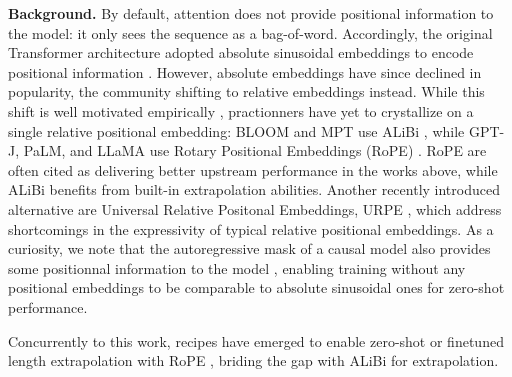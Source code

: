 \documentclass{article}
\begin{document}
\textbf{Background.} By default, attention does not provide positional information to the model: it only sees the sequence as a bag-of-word. Accordingly, the original Transformer architecture adopted absolute sinusoidal embeddings to encode positional information \citet{vaswani2017attention}. However, absolute embeddings have since declined in popularity, the community shifting to relative embeddings instead. While this shift is well motivated empirically \citep{relative_pos, what_lang_model}, practionners have yet to crystallize on a single relative positional embedding: BLOOM and MPT \citep{bloom, MPT30B} use ALiBi \citep{press2021alibi}, while GPT-J, PaLM, and LLaMA \citep{gpt-j, palm, llama, llama2} use Rotary Positional Embeddings (RoPE) \citep{su2021roformer}. RoPE are often cited as delivering better upstream performance in the works above, while ALiBi benefits from built-in extrapolation abilities. Another recently introduced alternative are Universal Relative Positonal Embeddings, URPE \citep{urpe}, which address shortcomings in the expressivity of typical relative positional embeddings. As a curiosity, we note that the autoregressive mask of a causal model also provides some positionnal information to the model \citep{what_lang_model, haviv2022transformer}, enabling training without any positional embeddings to be comparable to absolute sinusoidal ones for zero-shot performance.

Concurrently to this work, recipes have emerged to enable zero-shot or finetuned length extrapolation with RoPE \citep{chen2023extending}, briding the gap with ALiBi for extrapolation.
\end{document}
